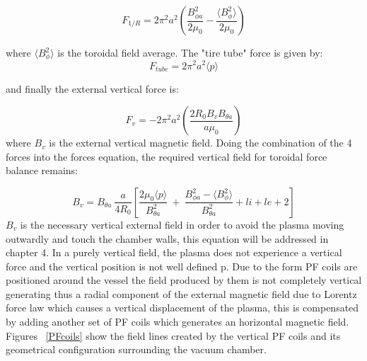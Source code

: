  \begin{equation}
 F_{1/R}=2\pi^2a^2 \left(\frac{ B_{\phi a}^2}{2\mu_0 }-\frac{\langle B_{\phi}^2 \rangle}{ 2\mu_0}\right)
 \end{equation}

where $\langle B_{\phi}^2 \rangle$ is the toroidal field average. The "tire tube" force is given by:
\begin{equation}
F_{tube}=2\pi^2a^2\langle p \rangle
\end{equation}

and finally the external vertical force is:

\begin{equation}
F_v=-2\pi^2a^2\left(\frac{2R_0 B_v B_{\theta a}}{a\mu_0}\right)
\end{equation}
 where $B_v$ is the external vertical magnetic field. Doing the combination of the 4 forces into the forces equation, the required vertical field for toroidal force balance remains:
 
 \begin{equation}
 B_v=B_{\theta a} ~\frac{a}{4R_0}\left[ \frac{2\mu_0 \langle p \rangle }{ B_{\theta a}^2} ~+~\frac{ B_{\phi a}^2 - \langle B_{\phi}^2 \rangle }{B_{\theta a}^2 } +li+le+2 \right]
 \label{force_balance}
 \end{equation}
  $B_v$ is the necessary vertical external field in order to avoid the plasma moving outwardly and touch the chamber walls, this equation will be addressed in chapter 4. In a purely vertical field, the plasma does not experience a vertical force and the vertical position is not well defined \cite[Chapter~4]{Zohm2015}p. Due to the form  PF coils are positioned around the vessel the field produced by them is not completely vertical generating thus a radial component of the external magnetic field  due to Lorentz force law which  causes a vertical displacement of the plasma, this is compensated by adding another set of PF coils which generates an horizontal magnetic field. Figures ~\ref{PFcoils} show the field lines created by the vertical PF coils and its geometrical configuration surrounding the vacuum chamber. \smallskip
  
